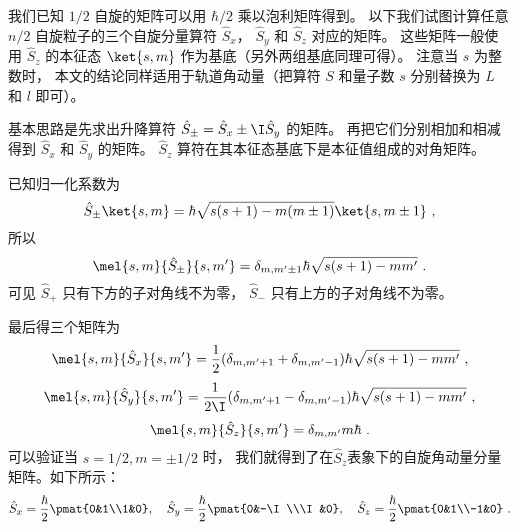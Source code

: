 

我们已知 $1/2$ 自旋的矩阵可以用 $\hbar/2$ 乘以泡利矩阵得到。 以下我们试图计算任意 $n/2$ 自旋粒子的三个自旋分量算符 $\hat S_x$， $\hat S_y$ 和 $\hat S_z$ 对应的矩阵。 这些矩阵一般使用 $\hat S_z$ 的本征态 $\ket{s, m}$ 作为基底（另外两组基底同理可得）。 注意当 $s$ 为整数时， 本文的结论同样适用于轨道角动量（把算符 $S$ 和量子数 $s$ 分别替换为 $L$ 和 $l$ 即可）。

基本思路是先求出升降算符 $\hat S_\pm = \hat S_x \pm \I \hat S_y$ 的矩阵。 再把它们分别相加和相减得到 $\hat S_x$ 和 $\hat S_y$ 的矩阵。 $\hat S_z$ 算符在其本征态基底下是本征值组成的对角矩阵。

已知归一化系数为
\begin{equation}
\hat S_\pm \ket{s,m} = \hbar \sqrt{s(s + 1) - m(m \pm 1)} \ket{s,m\pm1}~,
\end{equation}
所以
\begin{equation}
\mel{s,m}{\hat S_\pm}{s,m'} = \delta_{m, m'\pm1} \hbar \sqrt{s(s + 1) - mm'}~.
\end{equation}
可见 $\hat S_+$ 只有下方的子对角线不为零， $\hat S_-$ 只有上方的子对角线不为零。

最后得三个矩阵为
\begin{equation}
\mel{s,m}{\hat S_x}{s,m'} = \frac12(\delta_{m, m'+1} + \delta_{m, m'-1})\hbar \sqrt{s(s + 1) - mm'} ~,
\end{equation}
\begin{equation}
\mel{s,m}{\hat S_y}{s,m'} = \frac{1}{2\I}(\delta_{m, m'+1} - \delta_{m, m'-1}) \hbar \sqrt{s(s + 1) - mm'}~,
\end{equation}
\begin{equation}
\mel{s,m}{\hat S_z}{s,m'} = \delta_{m,m'} m\hbar ~.
\end{equation}
可以验证当 $s = 1/2, m = \pm1/2$ 时， 我们就得到了在$\hat S_z$表象下的自旋角动量分量矩阵。如下所示：
\begin{equation}
\hat S_x=\frac{\hbar}{2}\pmat{0&1\\1&0},\quad\hat S_y=\frac{\hbar}{2}\pmat{0&-\I\\\I&0},\quad\hat S_z=\frac{\hbar}{2}\pmat{0&1\\-1&0}~.
\end{equation}

